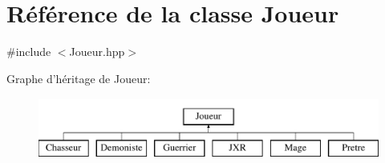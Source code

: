 \hypertarget{class_joueur}{\section{\-Référence de la classe \-Joueur}
\label{class_joueur}
}


{\ttfamily \#include $<$\-Joueur.\-hpp$>$}

\-Graphe d'héritage de \-Joueur\-:\begin{figure}[H]
\begin{center}
\leavevmode
\includegraphics[height=2.000000cm]{class_joueur}
\end{center}
\end{figure}
